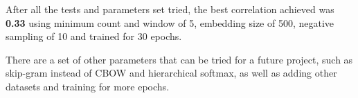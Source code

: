 \documentclass[11pt,oneside,a4paper]{article}
\begin{document}
After all the tests and parameters set tried, the best correlation achieved was \textbf{0.33} using minimum count and window of 5, embedding size of 500, negative sampling of 10 and trained for 30 epochs.

There are a set of other parameters that can be tried for a future project, such as skip-gram instead of CBOW and hierarchical softmax, as well as adding other datasets and training for more epochs.


\clearpage



\end{document}
